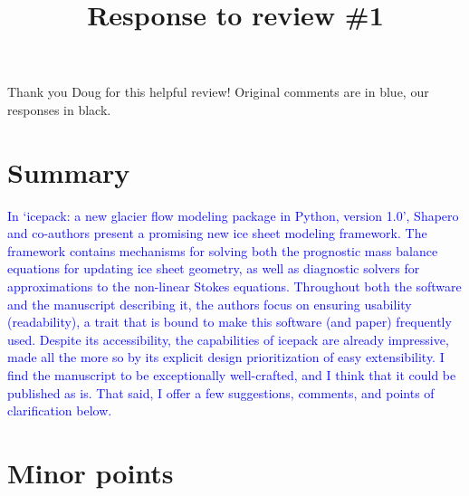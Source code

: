 \documentclass{article}
\theoremstyle{definition}
\theoremstyle{plain}
\begin{document}
\title{Response to review \#1}
\author{}
\date{}

\maketitle

Thank you Doug for this helpful review!
Original comments are in blue, our responses in black.

\section*{Summary}

\textcolor{blue}{In `icepack: a new glacier flow modeling package in Python, version 1.0', Shapero and co-authors present a promising new ice sheet modeling framework. The
framework contains mechanisms for solving both the prognostic mass balance
equations for updating ice sheet geometry, as well as diagnostic solvers for approximations to the non-linear Stokes equations. Throughout both the software
and the manuscript describing it, the authors focus on ensuring usability (readability), a trait that is bound to make this software (and paper) frequently used.
Despite its accessibility, the capabilities of icepack are already impressive, made
all the more so by its explicit design prioritization of easy extensibility.
I find the manuscript to be exceptionally well-crafted, and I think that it
could be published as is. That said, I offer a few suggestions, comments, and
points of clarification below.}


\section*{Minor points}
\end{document}
